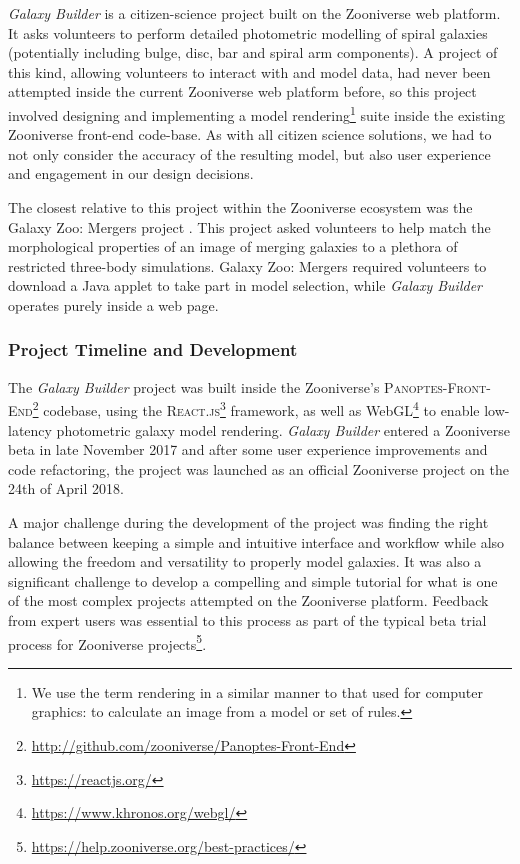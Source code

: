 \documentclass[trackchanges]{aastex63}
\begin{document}
\textit{Galaxy Builder} is a citizen-science project built on the Zooniverse web platform. It asks volunteers to perform detailed photometric modelling of spiral galaxies (potentially including bulge, disc, bar and spiral arm components). A project of this kind, allowing volunteers to interact with and model data, had never been attempted inside the current Zooniverse web platform before, so this project involved designing and implementing a model rendering\footnote{We use the term rendering in a similar manner to that used for computer graphics: to calculate an image from a model or set of rules.} suite inside the existing Zooniverse front-end code-base. As with all citizen science solutions, we had to not only consider the accuracy of the resulting model, but also user experience and engagement in our design decisions.

The closest relative to this project within the Zooniverse ecosystem was the Galaxy Zoo: Mergers project \citep{Holincheck2016:1604.00435v1}. This project asked volunteers to help match the morphological properties of an image of merging galaxies to a plethora of restricted three-body simulations. Galaxy Zoo: Mergers required volunteers to download a Java applet to take part in model selection, while \textit{Galaxy Builder} operates purely inside a web page.

\subsubsection{Project Timeline and Development}

The \textit{Galaxy Builder} project was built inside the Zooniverse's \citep{Simpson:2014:ZOW:2567948.2579215} \textsc{Panoptes-Front-End}\footnote{\url{http://github.com/zooniverse/Panoptes-Front-End}} codebase, using the \textsc{React.js}\footnote{\url{https://reactjs.org/}} framework, as well as WebGL\footnote{\url{https://www.khronos.org/webgl/}} to enable low-latency photometric galaxy model rendering. \textit{Galaxy Builder} entered a Zooniverse beta in late November 2017 and after some user experience improvements and code refactoring, the project was launched as an official Zooniverse project on the 24th of April 2018.

A major challenge during the development of the project was finding the right balance between keeping a simple and intuitive interface and workflow while also allowing the freedom and versatility to properly model galaxies. It was also a significant challenge to develop a compelling and simple tutorial for what is one of the most complex projects attempted on the Zooniverse platform. Feedback from expert users was essential to this process as part of the typical beta trial process for Zooniverse projects\footnote{\url{https://help.zooniverse.org/best-practices/}}.
\end{document}
